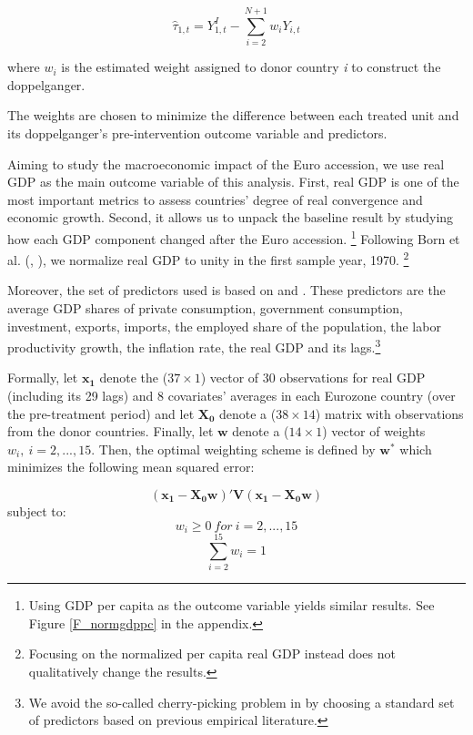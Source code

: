\documentclass[12pt]{article}
\renewcommand{\vec}[1]{\mathbf{#1}}
\begin{document}
\begin{equation}
\label{EQ_objective}
    \hat{\tau}_{1,t} = Y_{1,t}^I - \sum\limits_{i=2}^{N+1} w_i Y_{i,t}
\end{equation}

where $w_i$ is the estimated weight assigned to donor country \textit{i} to construct the doppelganger.

The weights are chosen to minimize the difference between each treated unit and its doppelganger's pre-intervention outcome variable and predictors. 

Aiming to study the macroeconomic impact of the Euro accession, we use real GDP as the main outcome variable of this analysis. First, real GDP is one of the most important metrics to assess countries' degree of real convergence and economic growth. Second, it allows us to unpack the baseline result by studying how each GDP component changed after the Euro accession. \footnote{Using GDP per capita as the outcome variable yields similar results. See Figure \ref{F_normgdppc} in the appendix.} Following Born et al. (\citeyear{Born2018}, \citeyear{Born2019}), we normalize real GDP to unity in the first sample year, 1970. \footnote{Focusing on the normalized per capita real GDP instead does not qualitatively change the results.}  

Moreover, the set of predictors used is based on \cite{Abadie2003} and \cite{Born2019}. These predictors are the average GDP shares of private consumption, government consumption, investment, exports, imports, the employed share of the population, the labor productivity growth, the inflation rate, the real GDP and its lags.\footnote{We avoid the so-called cherry-picking problem in \cite{Ferman2017} by choosing a standard set of predictors based on previous empirical literature.}

Formally, let $\vec{x_1}$ denote the ($37 \times 1$) vector of $30$ observations for real GDP (including its 29 lags) and $8$ covariates' averages in each Eurozone country (over the pre-treatment period) and let $\vec{X_0}$ denote a ($38 \times 14$) matrix with observations from the donor countries. Finally, let $\vec{w}$ denote a ($14 \times 1$) vector of weights $w_i, \ i=2,...,15$. Then, the optimal weighting scheme is defined by $\vec{w^*}$ which minimizes the following mean squared error:

\begin{equation}
    \label{EQ_min}
    (\vec{x_1}-\vec{X_0}\vec{w})'\vec{V}(\vec{x_1}-\vec{X_0}\vec{w})
\end{equation}
\indent subject to:
\begin{equation}
    w_i \geq 0 \ for \ i=2,...,15
\end{equation}
\begin{equation}
    \sum_{i=2}^{15} w_i = 1
\end{equation}
\end{document}
